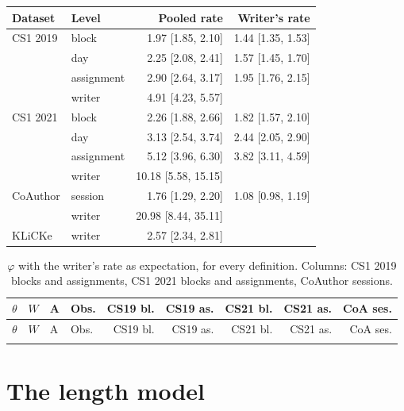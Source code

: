 \begin{center}\footnotesize
\begin{tabular}{@{}l l r r@{}}
\toprule
Dataset & Level & Pooled rate & Writer's rate \\
\midrule
CS1 2019 & block & 1.97 [1.85, 2.10] & 1.44 [1.35, 1.53] \\
 & day & 2.25 [2.08, 2.41] & 1.57 [1.45, 1.70] \\
 & assignment & 2.90 [2.64, 3.17] & 1.95 [1.76, 2.15] \\
 & writer & 4.91 [4.23, 5.57] & \\
CS1 2021 & block & 2.26 [1.88, 2.66] & 1.82 [1.57, 2.10] \\
 & day & 3.13 [2.54, 3.74] & 2.44 [2.05, 2.90] \\
 & assignment & 5.12 [3.96, 6.30] & 3.82 [3.11, 4.59] \\
 & writer & 10.18 [5.58, 15.15] & \\
CoAuthor & session & 1.76 [1.29, 2.20] & 1.08 [0.98, 1.19] \\
 & writer & 20.98 [8.44, 35.11] & \\
KLiCKe & writer & 2.57 [2.34, 2.81] & \\
\bottomrule
\end{tabular}
\label{tab:s4b}
\end{center}

{\scriptsize
\begin{longtable}{@{}l r l l r r r r r@{}}
\caption{$\varphi$ with the writer's rate as expectation, for every definition. Columns: CS1 2019 blocks and
assignments, CS1 2021 blocks and assignments, CoAuthor sessions.}\label{tab:s4}\\
\toprule
$\theta$ & $W$ & A & Obs. & CS19 bl. & CS19 as. & CS21 bl. & CS21 as. & CoA ses. \\
\midrule
\endfirsthead
\toprule
$\theta$ & $W$ & A & Obs. & CS19 bl. & CS19 as. & CS21 bl. & CS21 as. & CoA ses. \\
\midrule
\endhead
\bottomrule
\endfoot

\end{longtable}
}

\section{The length model}
\label{app:length}

